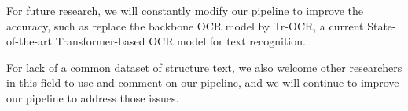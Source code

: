 \documentclass{article}
\begin{document}
For future research, we will constantly modify our pipeline to improve the accuracy, such as replace the backbone OCR model by Tr-OCR, a current State-of-the-art Transformer-based OCR model for text recognition.

For lack of a common dataset of structure text, we also welcome other researchers in this field to use and comment on our pipeline, and we will continue to improve our pipeline to address those issues.




\end{document}
